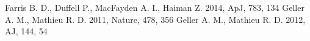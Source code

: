 \documentclass{aastex62}
\begin{document}
\begin{thebibliography}{}
 Farris B. D., Duffell P., MacFayden A. I., Haiman Z. 2014, ApJ, 783, 134 
  Geller A. M., Mathieu R. D. 2011, Nature, 478, 356
 Geller A. M., Mathieu R. D. 2012, AJ, 144, 54

\end{thebibliography}
\end{document}
